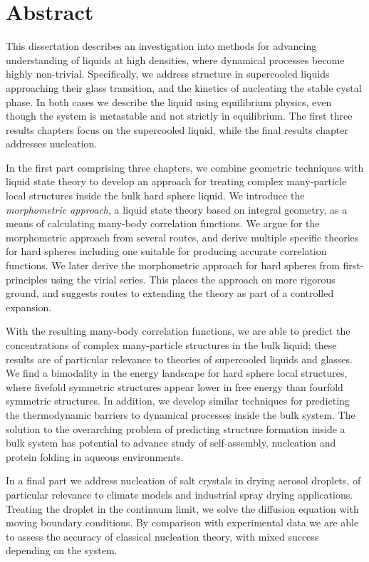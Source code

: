 \chapter*{Abstract}

This dissertation describes an investigation into methods for advancing understanding of liquids at high densities, where dynamical processes become highly non-trivial.
Specifically, we address structure in supercooled liquids approaching their glass transition, and the kinetics of nucleating the stable cystal phase.
In both cases we describe the liquid using equilibrium physics, even though the system is metastable and not strictly in equilibrium.
The first three results chapters focus on the supercooled liquid, while the final results chapter addresses nucleation.

In the first part comprising three chapters, we combine geometric techniques with liquid state theory to develop an approach for treating complex many-particle local structures inside the bulk hard sphere liquid.
We introduce the \emph{morphometric approach}, a liquid state theory based on integral geometry, as a means of calculating many-body correlation functions.
We argue for the morphometric approach from several routes, and derive multiple specific theories for hard spheres including one suitable for producing accurate correlation functions.
We later derive the morphometric approach for hard spheres from first-principles using the virial series.
This places the approach on more rigorous ground, and suggests routes to extending the theory as part of a controlled expansion.

With the resulting many-body correlation functions, we are able to predict the concentrations of complex many-particle structures in the bulk liquid; these results are of particular relevance to theories of supercooled liquids and glasses.
We find a bimodality in the energy landscape for hard sphere local structures, where fivefold symmetric structures appear lower in free energy than fourfold symmetric structures.
In addition, we develop similar techniques for predicting the thermodynamic barriers to dynamical processes inside the bulk system.
The solution to the overarching problem of predicting structure formation inside a bulk system has potential to advance study of self-assembly, nucleation and protein folding in aqueous environments.

In a final part we address nucleation of salt crystals in drying aerosol droplets, of particular relevance to climate models and industrial spray drying applications.
Treating the droplet in the continuum limit, we solve the diffusion equation with moving boundary conditions.
By comparison with experimental data we are able to assess the accuracy of classical nucleation theory, with mixed success depending on the system.

